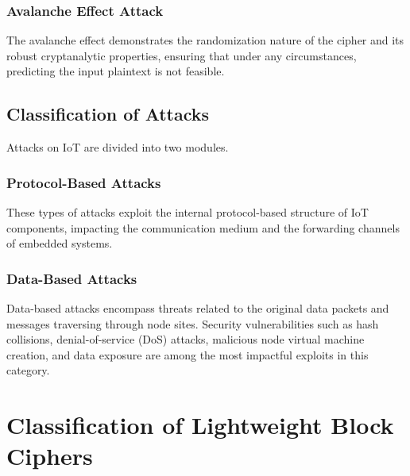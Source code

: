 \documentclass[conference,compsoc]{IEEEtran}
\begin{document}
\subsubsection{Avalanche Effect Attack} 
The avalanche effect demonstrates the randomization nature of the cipher and its robust cryptanalytic properties, ensuring that under any circumstances, predicting the input plaintext is not feasible\cite{muthavhine2018analysis}.
\subsection{Classification of Attacks}
Attacks on IoT are divided into two modules\cite{NIST}.
\subsubsection{Protocol-Based Attacks} 
These types of attacks exploit the internal protocol-based structure of IoT components, impacting the communication medium and the forwarding channels of embedded systems.
\subsubsection{Data-Based Attacks} 
Data-based attacks encompass threats related to the original data packets and messages traversing through node sites. Security vulnerabilities such as hash collisions, denial-of-service (DoS) attacks, malicious node virtual machine creation, and data exposure are among the most impactful exploits in this category.

\section{Classification of Lightweight Block Ciphers}
\end{document}
